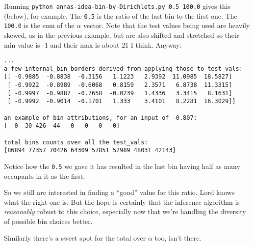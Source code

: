 \documentclass[11pt]{article}
\begin{document}
Running \verb+python annas-idea-bin-by-Dirichlets.py 0.5 100.0+ gives
this (below), for example. The \verb+0.5+ is the ratio of the last bin
to the first one. The \verb+100.0+ is the sum of the $\alpha$ vector.
Note that the test values being used are heavily skewed, as in the
previous example, but are also shifted and stretched so their min
value is -1 and their max is about 21 I think. Anyway:
\begin{verbatim}
...
a few internal_bin_borders derived from applying those to test_vals:
[[ -0.9885  -0.8838  -0.3156   1.1223   2.9392  11.0985  18.5827]
 [ -0.9922  -0.8989  -0.6068   0.8159   2.3571   6.8738  11.3315]
 [ -0.9997  -0.9887  -0.7658  -0.0239   1.4336   3.3415   8.1631]
 [ -0.9992  -0.9014  -0.1701   1.333    3.4101   8.2281  16.3029]]

an example of bin attributions, for an input of -0.807: 
[  0  30 426  44   0   0   0   0]

total bins counts over all the test_vals: 
[86894 77357 70426 64309 57851 52989 48031 42143]
\end{verbatim}
Notice how the \verb+0.5+ we gave it has resulted in the last bin having half as many occupants in it as the first.

So we still are interested in finding a ``good'' value for this ratio. Lord knows what the right one is.
But the hope is certainly that the inference algorithm is {\it reasonably} robust to this choice, especially now that we're handling the diversity of possible bin choices better.

Similarly there's a sweet spot for the total over $\alpha$ too, isn't there. 

\Line
\end{document}
